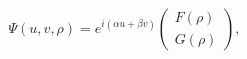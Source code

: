 \begin{equation}
\Psi \left( u,v,\rho \right) =e^{i\left( \alpha u+\beta v\right)
}
\left(\begin{array}{c}
F(\rho)\\
G(\rho)
\end{array}\right),
\label{ansatz}
\end{equation}

